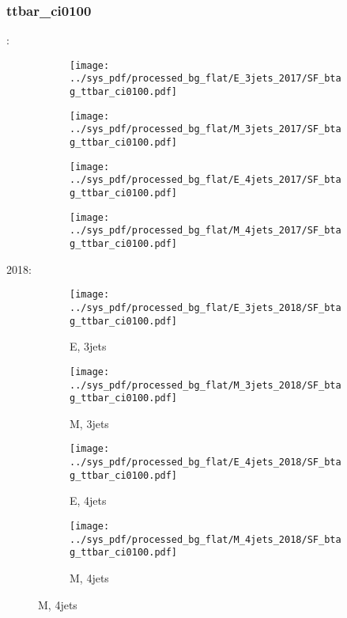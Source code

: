 \documentclass{beamer}
\begin{document}
\begin{frame}
\frametitle{ttbar_ci0100}
\fontsize{5}{1}:
\begin{figure}
\centering
\begin{subfigure}[b]{0.24\textwidth}
\texttt{[image: ../sys\_pdf/processed\_bg\_flat/E\_3jets\_2017/SF\_btag\_ttbar\_ci0100.pdf]}
\end{subfigure}
\begin{subfigure}[b]{0.24\textwidth}
\texttt{[image: ../sys\_pdf/processed\_bg\_flat/M\_3jets\_2017/SF\_btag\_ttbar\_ci0100.pdf]}
\end{subfigure}
\begin{subfigure}[b]{0.24\textwidth}
\texttt{[image: ../sys\_pdf/processed\_bg\_flat/E\_4jets\_2017/SF\_btag\_ttbar\_ci0100.pdf]}
\end{subfigure}
\begin{subfigure}[b]{0.24\textwidth}
\texttt{[image: ../sys\_pdf/processed\_bg\_flat/M\_4jets\_2017/SF\_btag\_ttbar\_ci0100.pdf]}
\end{subfigure}
\end{figure}
2018:
\begin{figure}
\centering
\begin{subfigure}[b]{0.24\textwidth}
\texttt{[image: ../sys\_pdf/processed\_bg\_flat/E\_3jets\_2018/SF\_btag\_ttbar\_ci0100.pdf]}
\captionsetup{font=tiny}
\caption{E, 3jets}
\end{subfigure}
\begin{subfigure}[b]{0.24\textwidth}
\texttt{[image: ../sys\_pdf/processed\_bg\_flat/M\_3jets\_2018/SF\_btag\_ttbar\_ci0100.pdf]}
\captionsetup{font=tiny}
\caption{M, 3jets}
\end{subfigure}
\begin{subfigure}[b]{0.24\textwidth}
\texttt{[image: ../sys\_pdf/processed\_bg\_flat/E\_4jets\_2018/SF\_btag\_ttbar\_ci0100.pdf]}
\captionsetup{font=tiny}
\caption{E, 4jets}
\end{subfigure}
\begin{subfigure}[b]{0.24\textwidth}
\texttt{[image: ../sys\_pdf/processed\_bg\_flat/M\_4jets\_2018/SF\_btag\_ttbar\_ci0100.pdf]}
\captionsetup{font=tiny}
\caption{M, 4jets}
\end{subfigure}
\end{figure}
\end{frame}
\end{document}
